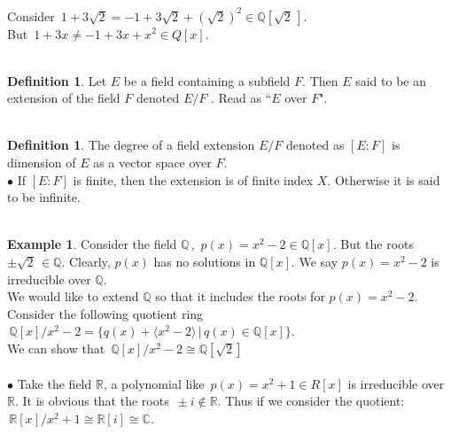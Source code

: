 \documentclass[11pt,a4paper]{article}
\theoremstyle{definition}
\newtheorem{defn}[thm]{Definition}
\newtheorem{exa}[thm]{Example}
\begin{document}
Consider $\, 1 + 3\sqrt{2}  = -1 + 3\sqrt{2}  + (\sqrt{2})^2 \in \mathbb{Q}[\sqrt{2}\,]$.\\

But $\, 1 + 3x \neq -1 + 3x + x^2 \in Q [x]$.\\\\



\begin{defn}
Let $E$ be a field containing a subfield $F$. Then $E$ said to be an extension of the field $F$ denoted $E/F$ .  Read as ``$E$ over $F$".\\\\
\end{defn}


\begin{defn}
The degree of a field extension $E/F$ denoted as $[E:F]$ is dimension of $E$ as a vector space over $F$.\\



$\bullet$ If $[E:F]$ is finite, then the extension is of finite index $X$. Otherwise it is said to be infinite.\\\\
\end{defn}


\begin{exa}
Consider the field $\mathbb{Q}\, , \,\, p(x)  = x^2 - 2\in \mathbb{Q}[x]$. But the roots $\pm \sqrt{2}\, \in \mathbb{Q}$. Clearly, $p(x)$ has no solutions in $\mathbb{Q}[x]$. We say $p(x) = x^2 - 2$ is irreducible over $\mathbb{Q}$.\\
We would like to extend $\mathbb{Q}$ so that it includes the roots for $p(x) = x^2 - 2$.\\
Consider the following quotient ring $\, \mathbb{Q}[x]/x^2 - 2  = \{q(x) + \langle x^2 - 2\rangle\, |\, q(x)\in \mathbb{Q}[x]\}$.\\

We can show that $\, \mathbb{Q}[x]/x^2 - 2 \cong \mathbb{Q}[\sqrt{2}]$\\\\


$\bullet$ Take the field $\mathbb{R}$, a polynomial like $\, p(x) = x^2 + 1 \in R[x]$ is irreducible over $\mathbb{R}$. It is obvious that the roots $\, \pm i \not\in \mathbb{R}$. Thus if we consider the quotient: $\, \mathbb{R}[x]/x^2 + 1 \cong \mathbb{R}[i] \cong \mathbb{C}$.\\\\
\end{exa}
\end{document}
